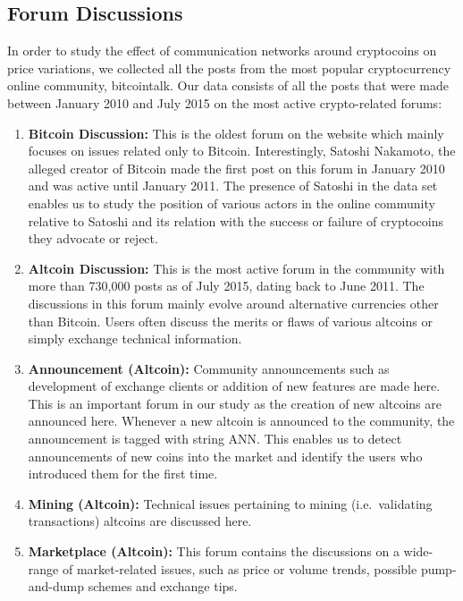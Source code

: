 \subsection{Forum Discussions}

In order to study the effect of communication networks around cryptocoins on
price variations, we collected all the posts from the most popular cryptocurrency
online community, bitcointalk.  Our data consists of all the posts that were
made between January 2010 and July 2015 on the most active crypto-related forums:
\begin{enumerate}[topsep=0pt,itemsep=-0.5ex,partopsep=1ex,parsep=1ex]
  \item \textbf{Bitcoin Discussion:} This is the oldest forum on the website which mainly focuses
    on issues related only to Bitcoin. Interestingly, Satoshi Nakamoto, the alleged
    creator of Bitcoin made the first post on this forum in January 2010 and
    was active until January 2011. The presence of Satoshi in the data set enables us
    to study the position of various actors in the online community relative to Satoshi
    and its relation with the success or failure of cryptocoins they advocate or reject.
  \item \textbf{Altcoin Discussion:} This is the most active forum in the community
    with more than 730,000 posts as of July 2015, dating back to June 2011.
    The discussions in this forum mainly evolve around alternative currencies
    other than Bitcoin. Users often discuss the merits or flaws of various
    altcoins or simply exchange technical information.
  \item \textbf{Announcement (Altcoin):} Community announcements such as development of 
    exchange clients or addition of new features are made here. This is an important forum
    in our study as the creation of new altcoins are announced here. Whenever a new
    altcoin is announced to the community, the announcement is tagged with string ANN.
    This enables us to detect announcements of new coins into the market and identify
    the users who introduced them for the first time.
  \item \textbf{Mining (Altcoin):} Technical issues pertaining to mining (i.e.~validating transactions)
    altcoins are discussed here.
  \item \textbf{Marketplace (Altcoin):} This forum contains the discussions on a wide-range of 
    market-related issues, such as price or volume trends, possible pump-and-dump schemes
    and exchange tips.
\end{enumerate}

